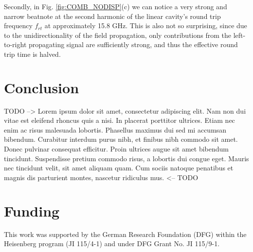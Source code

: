 \documentclass[journal]{IEEEtran}
\begin{document}
	
	Secondly, in Fig. \ref{fig:COMB_NODISP}(c) we can notice a very strong and narrow beatnote at the second harmonic of the linear cavity's round trip frequency $f_{rt}$ at approximately 15.8 GHz. This is also not so surprising, since due to the unidirectionality of the field propagation, only contributions from the left-to-right propagating signal are sufficiently strong, and thus the effective round trip time is halved.  
	\section{Conclusion}
	TODO --> Lorem ipsum dolor sit amet, consectetur adipiscing elit. Nam non dui vitae est eleifend rhoncus quis a nisi. In placerat porttitor ultrices. Etiam nec enim ac risus malesuada lobortis. Phasellus maximus dui sed mi accumsan bibendum. Curabitur interdum purus nibh, et finibus nibh commodo sit amet. Donec pulvinar consequat efficitur. Proin ultrices augue sit amet bibendum tincidunt. Suspendisse pretium commodo risus, a lobortis dui congue eget. Mauris nec tincidunt velit, sit amet aliquam quam. Cum sociis natoque penatibus et magnis dis parturient montes, nascetur ridiculus mus. <-- TODO

	\section*{Funding}
	This work was supported by the German Research Foundation (DFG) within the Heisenberg program (JI 115/4-1) and under DFG Grant No. JI 115/9-1.

	
	
	
	
\end{document}
